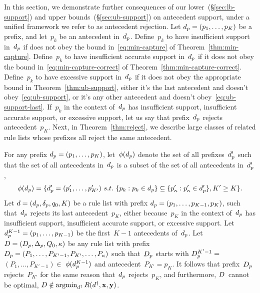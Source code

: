 In this section, we demonstrate further consequences of
our lower~(\S\ref{sec:lb-support}) and upper
bounds~(\S\ref{sec:ub-support}) on antecedent support,
under a unified framework we refer to as antecedent rejection.
%
Let ${d_p = (p_1, \dots, p_K)}$ be a prefix,
and let~$p_k$ be an antecedent in~$d_p$.
%
Define~$p_k$ to have insufficient support in~$d_p$
if does not obey the bound in~\eqref{eq:min-capture}
of Theorem~\ref{thm:min-capture}.
%
Define~$p_k$ to have insufficient accurate support in~$d_p$
if it does not obey the bound in~\eqref{eq:min-capture-correct}
of Theorem~\ref{thm:min-capture-correct}.
%
Define~$p_k$ to have excessive support in~$d_p$ if it
does not obey the appropriate bound in Theorem~\ref{thm:ub-support},
\ie either it's the last antecedent and doesn't obey~\eqref{eq:ub-support},
or it's any other antecedent and doesn't obey~\eqref{eq:ub-support-last}.
%
If~$p_k$ in the context of~$d_p$ has insufficient support,
insufficient accurate support, or excessive support,
let us say that prefix~$d_p$ rejects antecedent~$p_K$.
%
Next, in Theorem~\ref{thm:reject}, we describe large classes of
related rule lists whose prefixes all reject the same antecedent.

\begin{theorem}
\label{thm:reject}
For any prefix ${d_p = (p_1, \dots, p_K)}$,
let~$\phi(d_p)$ denote the set of all
prefixes~$d_p'$ such that
the set of all antecedents in~$d_p$ is a subset of
the set of all antecedents in~$d_p'$, \ie
\begin{align}
\StartContains(\Prefix) =
\{\Prefix' = (p'_1, \dots, p'_{K'})
~s.t.~ \{p_k : p_k \in \Prefix \} \subseteq
\{p'_\kappa : p'_\kappa \in \Prefix'\}, K' \ge K \}.
\label{eq:start-contains}
\end{align}
%
Let ${{d} = (d_p, \delta_p, q_0, K)}$ be a rule list
with prefix ${d_p = (p_1, \dots, p_{K-1}, p_{K})}$,
such that~$d_p$ rejects its last antecedent~$p_{K}$,
either because~$p_{K}$ in the context of~$d_p$ has
insufficient support, insufficient accurate support,
or excessive support.
%
Let ${d_p^{K-1} = (p_1, \dots, p_{K-1})}$ be the
first~${K - 1}$ antecedents of~$d_p$.
%
Let ${{D} = (D_p, \Delta_p, Q_0, \kappa)}$
be any rule list with prefix
${D_p = (P_1, \dots, P_{K'-1}, P_{K'}, \dots, P_{\kappa})}$
such that~$D_p$ starts with ${D_p^{K'-1} =}$
${(P_1, \dots, P_{K'-1}) \in}$ ${\phi(d_p^{K-1})}$
and antecedent~${P_{K'} = p_{K}}$.
%
It follows that prefix~$D_p$ rejects~$P_{K'}$
for the same reason that~$d_p$ rejects~$p_{K}$,
and furthermore, ${D}$~cannot be optimal, \ie
${{D} \notin \operatorname*{argmin}_{{d}^\dagger} R({d}^\dagger, \mathbf{x}, \mathbf{y})}$.
\end{theorem}

